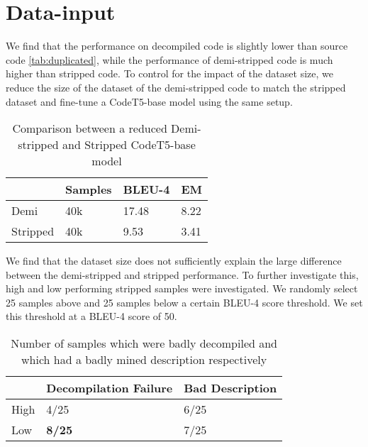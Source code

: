 
\section{Data-input}
We find that the performance on decompiled code is slightly lower than source code \ref{tab:duplicated}, while the performance of demi-stripped code is much higher than stripped code. To control for the impact of the dataset size, we reduce the size of the dataset of the demi-stripped code to match the stripped dataset and fine-tune a CodeT5-base model using the same setup.
\label{tab:demiSize}
\begin{table}[!h]
\centering
\begin{tabular}{llll}
\hline
\rowcolor[HTML]{C0C0C0} 
\multicolumn{1}{|l}{\cellcolor[HTML]{C0C0C0}\textbf{}} & Samples & BLEU-4 & \multicolumn{1}{l|}{\cellcolor[HTML]{C0C0C0}EM} \\ \hline
Demi                                                   & 40k     & 17.48  & 8.22
                                       \\
Stripped                                               & 40k     & 9.53   & 3.41                                           
\end{tabular}
\caption{Comparison between a reduced Demi-stripped and Stripped CodeT5-base model}
\end{table}

We find that the dataset size does not sufficiently explain the large difference between the demi-stripped and stripped performance. To further investigate this, high and low performing stripped samples were investigated. We randomly select 25 samples above and 25 samples below a certain BLEU-4 score threshold. We set this threshold at a BLEU-4 score of 50.

\label{tab:manual}
\begin{table}[!h]
\centering
\begin{tabular}{lll}
\hline
\rowcolor[HTML]{C0C0C0} 
\multicolumn{1}{|l}{\cellcolor[HTML]{C0C0C0}\textbf{}} & Decompilation Failure & \multicolumn{1}{l|}{\cellcolor[HTML]{C0C0C0}Bad Description} \\ \hline
High                                                   & 4/25                     & 6/25                                                            \\
Low                                                    & \textbf{8/25}                     & 7/25                                                           
\end{tabular}
\caption{Number of samples which were badly decompiled and which had a badly mined description respectively}
\end{table}

